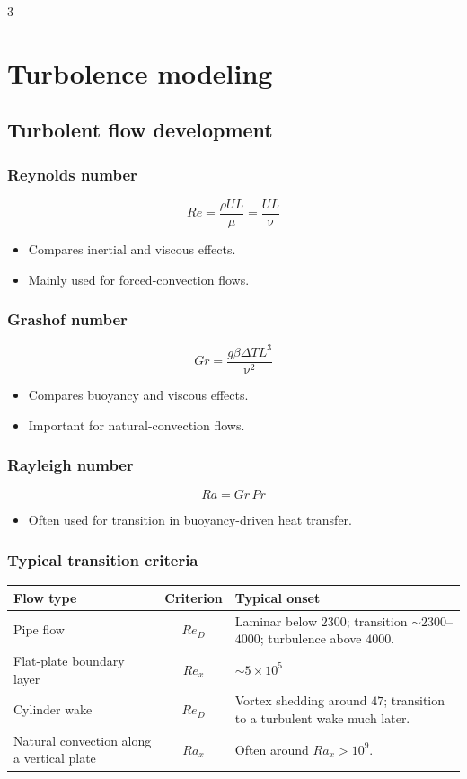 \documentclass[landscape, a4paper]{article}
\renewcommand{\nu}{\upnu}
\begin{document}
\begin{multicols*}{3}
\newcolumn
\section{Turbolence modeling}
\subsection{Turbolent flow development}
\subsubsection{Reynolds number}
\[
  Re = \frac{\rho U L}{\mu} = \frac{U L}{\nu}
\]
\begin{itemize}
  \item Compares inertial and viscous effects.
  \item Mainly used for forced-convection flows.
\end{itemize}

\subsubsection{Grashof number}
\[
  Gr = \frac{g\beta\Delta T L^3}{\nu^2}
\]
\begin{itemize}
  \item Compares buoyancy and viscous effects.
  \item Important for natural-convection flows.
\end{itemize}

\subsubsection{Rayleigh number}
\[
  Ra = Gr\,Pr
\]
\begin{itemize}
  \item Often used for transition in buoyancy-driven heat transfer.
\end{itemize}

\subsubsection{Typical transition criteria}
\begingroup
\scriptsize
\setlength{\tabcolsep}{3pt}
\renewcommand{\arraystretch}{1.2}
\noindent
\begin{tabularx}{\linewidth}{|>{\raggedright\arraybackslash}p{2.1cm}|c|>{\raggedright\arraybackslash}X|}
  \hline
  \textbf{Flow type} & \textbf{Criterion} & \textbf{Typical onset}\\
  \hline
  Pipe flow & $Re_D$ & Laminar below $2300$; transition $\sim 2300$--$4000$; turbulence above $4000$.\\
  \hline
  Flat-plate boundary layer & $Re_x$ & $\sim 5\times 10^5$\\
  \hline
  Cylinder wake & $Re_D$ & Vortex shedding around $47$; transition to a turbulent wake much later.\\
  \hline
  Natural convection along a vertical plate & $Ra_x$ & Often around $Ra_x>10^9$.\\
  \hline
\end{tabularx}
\par
\endgroup


\end{multicols*}
\end{document}
